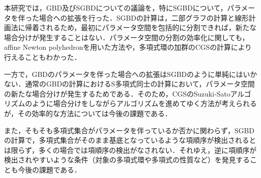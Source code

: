 本研究では，GBD及びSGBDについての議論を，特にSGBDについて，パラメータを伴った場合への拡張を行った．SGBDの計算は，二部グラフの計算と線形計画法に帰着されるため，最初にパラメータ空間を包括的に分割できれば，新たな場合分けが発生することはない．パラメータ空間の分割の効率化に関しても，affine Newton polyhedronを用いた方法や，多項式環の加群のCGSの計算により行えることもわかった．
\par
一方で，GBDのパラメータを伴った場合への拡張はSGBDのように単純にはいかない．通常のGBDの計算におけるS多項式同士の計算において，パラメータ空間の新たな場合分けが発生するためである．そのため，CGSのSuzuki-Satoアルゴリズム\cite{suzuki2003alternative}のように場合分けをしながらアルゴリズムを進めてゆく方法が考えられるが，その効率的な方法については今後の課題である．
\par
また，そもそも多項式集合がパラメータを伴っているか否かに関わらず，SGBDの計算で，多項式集合がそのまま\groebner{}基底となっているような項順序が検出されるとは限らず，多くの場合では項順序の検出がなされない．それゆえ，逆に項順序が検出されやすいような条件（対象の多項式環や多項式の性質など）を発見することも今後の課題である．